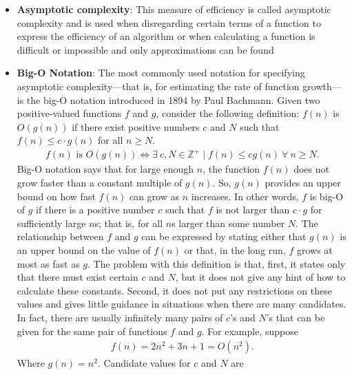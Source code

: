 \documentclass{report}
\begin{document}
\begin{itemize}
        \item \textbf{Asymptotic complexity}:  This measure of efficiency is called asymptotic complexity and is used when disregarding certain terms of a function to express the efficiency of an algorithm or when calculating a function is difficult or impossible and only approximations can be found
        \item \textbf{Big-O Notation}: The most commonly used notation for specifying asymptotic complexity—that is, for estimating the rate of function growth—is the big-O notation introduced in 1894 by Paul Bachmann.
            \bigbreak \noindent 
             Given two positive-valued functions $f$ and $g$, consider the following definition:
             \bigbreak \noindent 
             $f(n)$ is $O(g(n))$ if there exist positive numbers $c$ and $N$ such that $f(n) \leq c \cdot g(n)$ for all $n \geq N$.
             \begin{align*}
                 f(n) \text{ is } O(g(n)) \iff \exists\ c,N \in \mathbb{Z}^{+} \mid f(n) \le cg(n)\ \forall\ n \ge N
             .\end{align*}
             \bigbreak \noindent 
             Big-O notation says that for large enough $n$, the function $f(n)$ does not grow faster than a constant multiple of $g(n)$. So, $g(n)$ provides an upper bound on how fast $f(n)$ can grow as $n$ increases.
             \bigbreak \noindent 
             In other words, $f$ is big-O of $g$ if there is a positive number $c$ such that $f$ is not larger than $c \cdot g$ for sufficiently large $n$s; that is, for all $n$s larger than some number $N$. The relationship between $f$ and $g$ can be expressed by stating either that $g(n)$ is an upper bound on the value of $f(n)$ or that, in the long run, $f$ grows at most as fast as $g$.
             \bigbreak \noindent 
             The problem with this definition is that, first, it states only that there must exist
             certain $c$ and $N$, but it does not give any hint of how to calculate these constants. Second, it does not put any restrictions on these values and gives little guidance in situations when there are many candidates. In fact, there are usually infinitely many pairs
             of $c$'s and $N$'s that can be given for the same pair of functions $f$ and $g$.
             \bigbreak \noindent 
             For example, suppose 
             \begin{align*}
                 f(n) = 2n^{2} + 3n + 1 = O(n^{2})
             .\end{align*}
             Where $g(n) = n^{2}$. Candidate values for $c$ and $N$ are


\end{itemize}
\end{document}
